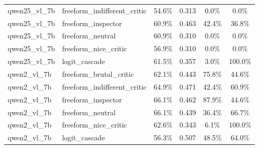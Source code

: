 \begin{table}[!htbp]
\begin{tabular}{@{}llcccc@{}}
qwen25\_vl\_7b & freeform\_indifferent\_critic & 54.6\% & 0.313 & 0.0\% & 0.0\% \\
qwen25\_vl\_7b & freeform\_inspector & 60.9\% & 0.463 & 42.4\% & 36.8\% \\
qwen25\_vl\_7b & freeform\_neutral & 60.9\% & 0.310 & 0.0\% & 0.0\% \\
qwen25\_vl\_7b & freeform\_nice\_critic & 56.9\% & 0.310 & 0.0\% & 0.0\% \\
qwen25\_vl\_7b & logit\_cascade & 61.5\% & 0.357 & 3.0\% & 100.0\% \\
qwen2\_vl\_7b & freeform\_brutal\_critic & 62.1\% & 0.443 & 75.8\% & 44.6\% \\
qwen2\_vl\_7b & freeform\_indifferent\_critic & 64.9\% & 0.471 & 42.4\% & 60.9\% \\
qwen2\_vl\_7b & freeform\_inspector & 66.1\% & 0.462 & 87.9\% & 44.6\% \\
qwen2\_vl\_7b & freeform\_neutral & 66.1\% & 0.439 & 36.4\% & 66.7\% \\
qwen2\_vl\_7b & freeform\_nice\_critic & 62.6\% & 0.343 & 6.1\% & 100.0\% \\
qwen2\_vl\_7b & logit\_cascade & 56.3\% & 0.507 & 48.5\% & 64.0\% \\
\bottomrule
\end{tabular}
\end{table}

